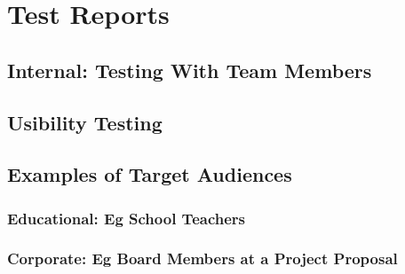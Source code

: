 
\section{Test Reports}

	\subsection{Internal: Testing With Team Members}

	\subsection{Usibility Testing}
	
	\subsection{Examples of Target Audiences}
	
		\subsubsection{Educational: Eg School Teachers}
		
		\subsubsection{Corporate: Eg Board Members at a Project Proposal }